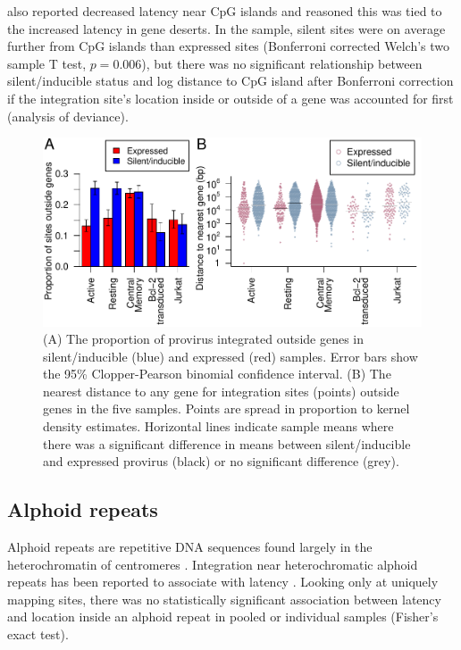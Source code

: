 \documentclass[../sherrill-Mix_thesis.tex]{subfiles}
\begin{document}
	\citet{Lewinski2005} also reported decreased latency near CpG islands and reasoned this was tied to the increased latency in gene deserts.  In the \Resting{} sample, silent sites were on average further from CpG islands than expressed sites (Bonferroni corrected Welch's two sample T test, $p=0.006$), but there was no significant relationship between silent/inducible status and log distance to CpG island after Bonferroni correction if the integration site's location inside or outside of a gene was accounted for first (analysis of deviance).

	\begin{figure}
		\centering
			\includegraphics[width=\textwidth]{geneDesert.pdf} %
		\caption[Genes and latency]{(A) The proportion of provirus integrated outside genes in silent/inducible (blue) and expressed (red) samples. Error bars show the 95\% Clopper-Pearson binomial confidence interval. (B) The nearest distance to any gene for integration sites (points) outside genes in the five samples. Points are spread in proportion to kernel density estimates. Horizontal lines indicate sample means where there was a significant difference in means between silent/inducible and expressed provirus (black) or no significant difference (grey).}
		\label{geneDeserts}
	\end{figure}

	\subsection{Alphoid repeats} %
		Alphoid repeats are repetitive DNA sequences found largely in the heterochromatin of centromeres \citep{Waye1987}. Integration near heterochromatic alphoid repeats has been reported to associate with latency \citep{Jordan2003,Lewinski2005,Pace2012}. Looking only at uniquely mapping sites, there was no statistically significant association between latency and location inside an alphoid repeat in pooled or individual samples (Fisher's exact test).
\end{document}
